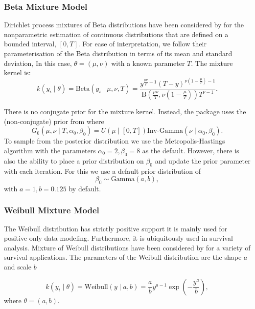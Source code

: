 \documentclass[nojss]{jss}
\begin{document}
\subsubsection{Beta Mixture Model}
Dirichlet process mixtures of Beta distributions have been considered by \cite{kottas_dirichlet_2006} for the nonparametric estimation of continuous distributions that are defined on a bounded interval, $\left[0, T \right]$. For ease of interpretation, we follow their parameterisation of the Beta distribution in terms of its mean and standard deviation, In this case, $\theta = (\mu,\nu)$ with a known parameter $T$. The mixture kernel is:
\begin{equation*}
k(y_i \mid \theta) = \text{Beta} (y_i \mid \mu, \nu, T) = \frac{y^{\frac{\mu \nu}{T} - 1} (T-y)^{\nu (1- \frac{\mu}{T})-1}}{\text{B}(\frac{\mu \nu}{T}, \nu(1-\frac{\mu}{T})) T^{\nu -1}}.
\end{equation*}

There is no conjugate prior for the mixture kernel. Instead, the  package uses the (non-conjugate) prior from \cite{kottas_dirichlet_2006} where
\begin{equation*}
G_0 (\mu , \nu \mid T, \alpha _0 , \beta _0) = U(\mu \mid [0, T]) \text{Inv-Gamma} (\nu \mid \alpha _0, \beta _0).
\end{equation*}
To sample from the posterior distribution we use the Metropolis-Hastings algorithm with the parameters $\alpha _0 = 2, \beta _0 =8$ as the default. However, there is also the ability to place a prior distribution on $\beta _0$ and update the prior parameter with each iteration. For this we use a default prior distribution of
\begin{equation*}
\beta _0 \sim \text{Gamma} (a, b),
\end{equation*}
with $a=1, b=0.125$ by default.

\subsubsection{Weibull Mixture Model}
The Weibull distribution has strictly positive support it is mainly used for positive only data modeling. Furthermore, it is ubiquitously used in survival analysis. Mixture of Weibull distributions have been considered by \cite{kottas_dirichlet_2006} for a variety of survival applications.
The parameters of the Weibull distribution are the shape $a$ and scale $b$

\begin{equation}
k(y_i \mid \theta) = \text{Weibull} (y \mid a, b) = \frac{a}{b} y ^{a-1}  \exp \left( -  \frac{y^a}{b}  \right),
\end{equation}
where $\theta = ( a, b )$.
\end{document}
